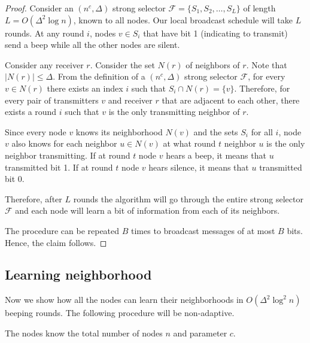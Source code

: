 \begin{proof}
Consider an $(n^c,\Delta)$ strong selector $\mathcal{F}=\{S_1,S_2,\dots, S_L\}$ of length $L=O(\Delta^2 \log n)$, known to all nodes. Our local broadcast schedule will take $L$ rounds. At any round $i$, nodes $v \in S_i$ that have bit 1 (indicating to transmit) send a beep while all the other nodes are silent.

Consider any receiver $r$. Consider the set $N(r)$ of neighbors of $r$. Note that $|N(r)| \leq \Delta$. From the definition of a $(n^c,\Delta)$ strong selector $\mathcal{F}$, for every $v \in N(r)$ there exists an index $i$ such that $S_i \cap N(r) = \{v\}$. Therefore, for every pair of transmitters $v$ and receiver $r$ that are adjacent to each other, there exists a round $i$ such that $v$ is the only transmitting neighbor of $r$.


Since every node $v$ knows its neighborhood $N(v)$ and the sets $S_i$ for all $i$, node $v$ also knows for each neighbor $u \in N(v)$ at what round $t$ neighbor $u$ is the only neighbor transmitting. If at round $t$ node $v$ hears a beep, it means that $u$ transmitted bit 1. If at round $t$ node $v$ hears silence, it means that $u$ transmitted bit 0.

Therefore, after $L$ rounds the algorithm will go through the entire strong selector $\mathcal{F}$ and each node will learn a bit of information from each of its neighbors.

The procedure can be repeated $B$ times to broadcast messages of at most $B$ bits.
Hence, the claim follows.
%
\end{proof}


\subsection{Learning neighborhood}
\label{sub:neighbourhood}


Now we show how all the nodes can learn their neighborhoods in $O(\Delta^2 \log^2 n)$ beeping rounds. The following procedure will be non-adaptive. 

The nodes know the total number of nodes $n$ and parameter $c$.

